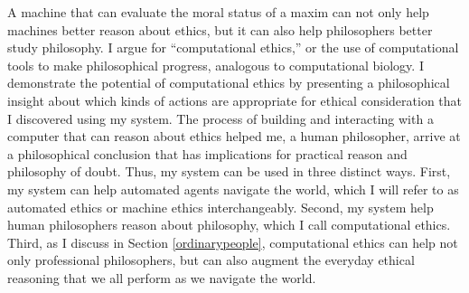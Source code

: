 \begin{isabellebody}
\begin{isamarkuptext}
A machine that can evaluate the moral status of a maxim can not only help machines better reason about ethics, 
but it can also help philosophers better study philosophy. I argue for ``computational ethics,'' or the use of computational tools to 
make philosophical progress, analogous to computational biology. 
I demonstrate the potential of computational ethics by presenting a 
philosophical insight about which kinds of actions are appropriate for ethical consideration that I 
discovered using my system. The process of building and interacting with a computer that can reason 
about ethics helped me, a human philosopher, arrive at a philosophical conclusion that has implications for practical
reason and philosophy of doubt. Thus, my system can be used in three distinct ways. First, my system can help
automated agents navigate the world, which I will refer to as automated ethics or machine ethics interchangeably. Second, 
my system help human philosophers reason about philosophy, which I call computational ethics. Third, as 
I discuss in Section \ref{ordinarypeople}, computational ethics can help not only professional philosophers,
but can also augment the everyday ethical reasoning that we all perform as we navigate the world.%
\end{isamarkuptext}\isamarkuptrue%
%
\isadelimtheory
%
\endisadelimtheory
%
\isatagtheory
%
\endisatagtheory
{\isafoldtheory}%
%
\isadelimtheory
%
\endisadelimtheory
%
\end{isabellebody}%
\endinput
